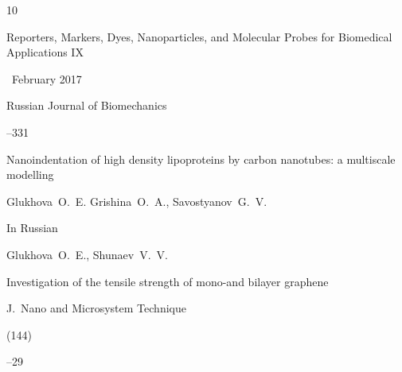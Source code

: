 \begin{thebibliography}{10}

\volinfo Reporters, Markers, Dyes, Nanoparticles, and Molecular Probes for Biomedical Applications IX


~February 2017








\jour Russian Journal of Biomechanics




--331

\paper Nanoindentation of high density lipoproteins by carbon nanotubes: a multiscale modelling

\by  Glukhova~O.~E. Grishina~O.~A., Savostyanov~G.~V.




\lang In Russian

\by  Glukhova~O.~E., Shunaev~V.~V.

\paper Investigation of the tensile strength of mono-and bilayer graphene

\jour J.~Nano and Microsystem Technique


(144)

--29



\end{thebibliography}



\renewcommand{\baselinestretch}{0.9}



%

